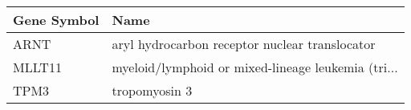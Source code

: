 \begin{tabular}{ll}
\toprule
Gene Symbol &                                               Name \\
\midrule
       ARNT &     aryl hydrocarbon receptor nuclear translocator \\
     MLLT11 & myeloid/lymphoid or mixed-lineage leukemia (tri... \\
       TPM3 &                                      tropomyosin 3 \\
\bottomrule
\end{tabular}
